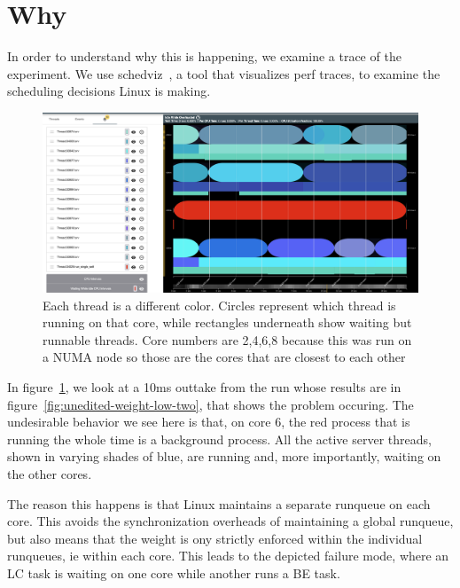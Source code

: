 
\section{Why}
\label{sec:why}

In order to understand why this is happening, we examine a trace of the
experiment. We use schedviz~\cite{schedviz}, a tool that visualizes perf traces,
to examine the scheduling decisions Linux is making.

\begin{figure}[t]
    \centering
    \includegraphics[width=\textwidth]{graphs/schedviz.png}
        \caption{Each thread is a different color. Circles represent which
    thread is running on that core, while rectangles underneath show waiting but
    runnable threads. Core numbers are 2,4,6,8 because this was run on a NUMA
    node so those are the cores that are closest to each other
    }\label{fig:schedviz}
\end{figure}

In figure~\ref{fig:schedviz}, we look at a 10ms outtake from the run whose
results are in figure~\ref{fig:unedited-weight-low-two}, that shows the problem
occuring. The undesirable behavior we see here is that, on core 6, the red
process that is running the whole time is a background process. All the active
server threads, shown in varying shades of blue, are running and, more
importantly, waiting on the other cores.~

The reason this happens is that Linux maintains a separate runqueue on each
core. This avoids the synchronization overheads of maintaining a global
runqueue, but also means that the weight is ony strictly enforced within the
individual runqueues, ie within each core. This leads to the depicted failure
mode, where an LC task is waiting on one core while another runs a BE task.
